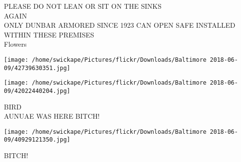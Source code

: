 \documentclass[10pt,letterpaper]{article}
\begin{document}
PLEASE DO NOT LEAN OR SIT ON THE SINKS\\
AGAIN\\
ONLY DUNBAR ARMORED SINCE 1923 CAN OPEN SAFE INSTALLED WITHIN THESE PREMISES\\
Flowers
\pagebreak

\texttt{[image: /home/swickape/Pictures/flickr/Downloads/Baltimore 2018-06-09/42739630351.jpg]}

\vspace{0.25in}
\texttt{[image: /home/swickape/Pictures/flickr/Downloads/Baltimore 2018-06-09/42022440204.jpg]}

BIRD\\
AUNUAE WAS HERE BITCH!
\pagebreak

\texttt{[image: /home/swickape/Pictures/flickr/Downloads/Baltimore 2018-06-09/40929121350.jpg]}

BITCH!
\pagebreak
\end{document}
